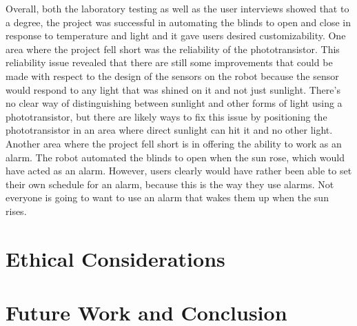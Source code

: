 \documentclass[10pt,twocolumn]{article}
\begin{document}
Overall, both the laboratory testing as well as the user interviews showed that to a degree, the project was successful in automating the blinds to open and close in response to temperature and light and it gave users desired customizability. One area where the project fell short was the reliability of the phototransistor. This reliability issue revealed that there are still some improvements that could be made with respect to the design of the sensors on the robot because the sensor would respond to any light that was shined on it and not just sunlight. There’s no clear way of distinguishing between sunlight and other forms of light using a phototransistor, but there are likely ways to fix this issue by positioning the phototransistor in an area where direct sunlight can hit it and no other light. Another area where the project fell short is in offering the ability to work as an alarm. The robot automated the blinds to open when the sun rose, which would have acted as an alarm. However, users clearly would have rather been able to set their own schedule for an alarm, because this is the way they use alarms. Not everyone is going to want to use an alarm that wakes them up when the sun rises. 

\section{Ethical Considerations}

\section{Future Work and Conclusion}

\printbibliography
\end{document}

